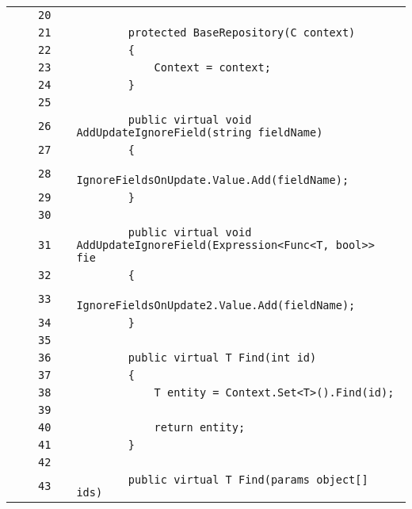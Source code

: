 \documentclass[a4paper,10pt]{article}
\begin{document}
\begin{longtable}[l]{lrrll}
\cellcolor{gray} &  & \verb~20~ & & \verb~~\\
\cellcolor{gray} &  & \verb~21~ & & \verb~        protected BaseRepository(C context)~\\
\cellcolor{gray} &  & \verb~22~ & & \verb~        {~\\
\cellcolor{gray} &  & \verb~23~ & & \verb~            Context = context;~\\
\cellcolor{gray} &  & \verb~24~ & & \verb~        }~\\
\cellcolor{gray} &  & \verb~25~ & & \verb~~\\
\cellcolor{gray} &  & \verb~26~ & & \verb~        public virtual void AddUpdateIgnoreField(string fieldName)~\\
\cellcolor{gray} &  & \verb~27~ & & \verb~        {~\\
\cellcolor{gray} &  & \verb~28~ & & \verb~            IgnoreFieldsOnUpdate.Value.Add(fieldName);~\\
\cellcolor{gray} &  & \verb~29~ & & \verb~        }~\\
\cellcolor{gray} &  & \verb~30~ & & \verb~~\\
\cellcolor{gray} &  & \verb~31~ & & \verb~        public virtual void AddUpdateIgnoreField(Expression<Func<T, bool>> fie~\\
\cellcolor{gray} &  & \verb~32~ & & \verb~        {~\\
\cellcolor{gray} &  & \verb~33~ & & \verb~            IgnoreFieldsOnUpdate2.Value.Add(fieldName);~\\
\cellcolor{gray} &  & \verb~34~ & & \verb~        }~\\
\cellcolor{gray} &  & \verb~35~ & & \verb~~\\
\cellcolor{gray} &  & \verb~36~ & & \verb~        public virtual T Find(int id)~\\
\cellcolor{gray} &  & \verb~37~ & & \verb~        {~\\
\cellcolor{gray} &  & \verb~38~ & & \verb~            T entity = Context.Set<T>().Find(id);~\\
\cellcolor{gray} &  & \verb~39~ & & \verb~~\\
\cellcolor{gray} &  & \verb~40~ & & \verb~            return entity;~\\
\cellcolor{gray} &  & \verb~41~ & & \verb~        }~\\
\cellcolor{gray} &  & \verb~42~ & & \verb~~\\
\cellcolor{gray} &  & \verb~43~ & & \verb~        public virtual T Find(params object[] ids)~\\

\end{longtable}
\end{document}
